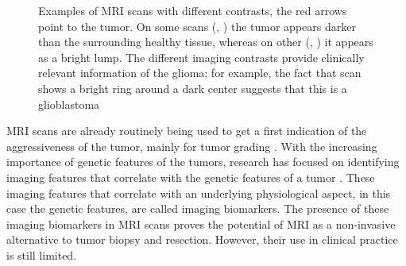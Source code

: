 \begin{figure}[hbt]
    \caption{Examples of \acrshort{MRI} scans with different contrasts, the red arrows point to the \gls{tumor}.
    On some scans (\textbf{\protect{}}, \textbf{\protect{}}) the \gls{tumor} appears darker than the surrounding healthy tissue, whereas on other (\textbf{\protect{}}, \textbf{\protect{}}) it appears as a bright lump.
     The different imaging contrasts provide clinically relevant information of the glioma; for example, the fact that scan \textbf{\protect{}} shows a bright ring around a dark center suggests that this is a glioblastoma}\label{fig:intro_MR_example}
\end{figure}

\gls{MRI} scans are already routinely being used to get a first indication of the aggressiveness of the \gls{tumor}, mainly for \gls{tumor} grading \autocite{upadhyay2011MRIevaluation}.
With the increasing importance of genetic features of the \glspl{tumor}, research has focused on identifying imaging features that correlate with the genetic features of a \gls{tumor} \autocite{patel2017mismatch, smits2016imaging}.
These imaging features that correlate with an underlying physiological aspect, in this case the genetic features, are called imaging biomarkers.
The presence of these imaging biomarkers in \gls{MRI} scans proves the potential of \gls{MRI} as a non-invasive alternative to \gls{tumor} biopsy and resection.
However, their use in clinical practice is still limited.

